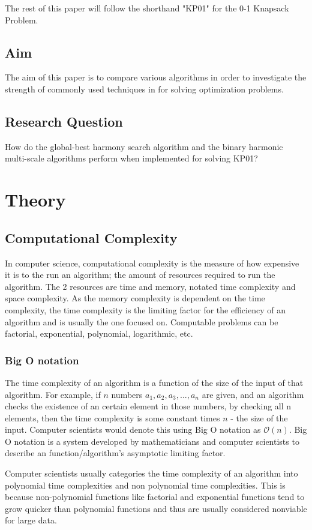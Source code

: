 \documentclass[titlepage]{article}
\begin{document}
The rest of this paper will follow the shorthand "KP01" for the 0-1 Knapsack Problem. 


\subsection{Aim}
The aim of this paper is to compare various algorithms in order to investigate the strength of commonly used techniques in for solving optimization problems.

\subsection{Research Question}
How do the global-best harmony search algorithm and the binary harmonic multi-scale algorithms perform when implemented for solving KP01?

\section{Theory}
\subsection{Computational Complexity}
In computer science, computational complexity is the measure of how expensive it is to the run an algorithm; the amount of resources required to run the algorithm. The 2 resources are time and memory, notated time complexity and space complexity. As the memory complexity is dependent on the time complexity, the time complexity is the limiting factor for the efficiency of an algorithm and is usually the one focused on. Computable problems can be factorial, exponential, polynomial, logarithmic, etc.

\subsubsection*{Big O notation}
The time complexity of an algorithm is a function of the size of the input of that algorithm. For example, if $n$ numbers $a_1, a_2, a_3, ..., a_n$ are given, and an algorithm checks the existence of an certain element in those numbers, by checking all n elements, then the time complexity is some constant times $n$ - the size of the input. Computer scientists would denote this using Big O notation as $\mathcal{O}(n)$. Big O notation is a system developed by mathematicians and computer scientists to describe an function/algorithm's asymptotic limiting factor.

Computer scientists usually categories the time complexity of an algorithm into polynomial time complexities and non polynomial time complexities. This is because non-polynomial functions like factorial and exponential functions tend to grow quicker than polynomial functions and thus are usually considered nonviable for large data. 
\end{document}

